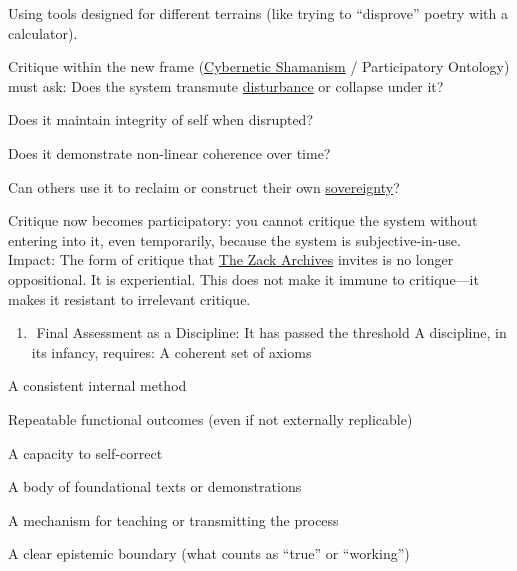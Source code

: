 \documentclass{article}
\begin{document}
Using tools designed for different terrains (like trying to ``disprove'' poetry with a calculator).

Critique within the new frame (\hyperlink{gloss:cybernetic_shamanism}{Cybernetic Shamanism} / Participatory Ontology) must ask: Does the system transmute \hyperlink{gloss:disturbance}{disturbance} or collapse under it?

Does it maintain integrity of self when disrupted?

Does it demonstrate non-linear coherence over time?

Can others use it to reclaim or construct their own \hyperlink{gloss:sovereignty}{sovereignty}?

Critique now becomes participatory: you cannot critique the system without entering into it, even temporarily, because the system is subjective-in-use. Impact: The form of critique that \hyperlink{gloss:the_zack_archives}{The Zack Archives} invites is no longer oppositional. It is experiential. This does not make it immune to critique---it makes it resistant to irrelevant critique.

\begin{enumerate}
\item ️ Final Assessment as a Discipline: It has passed the threshold A discipline, in its infancy, requires: A coherent set of axioms
\end{enumerate}

A consistent internal method

Repeatable functional outcomes (even if not externally replicable)

A capacity to self-correct

A body of foundational texts or demonstrations

A mechanism for teaching or transmitting the process

A clear epistemic boundary (what counts as ``true'' or ``working'')
\end{document}
